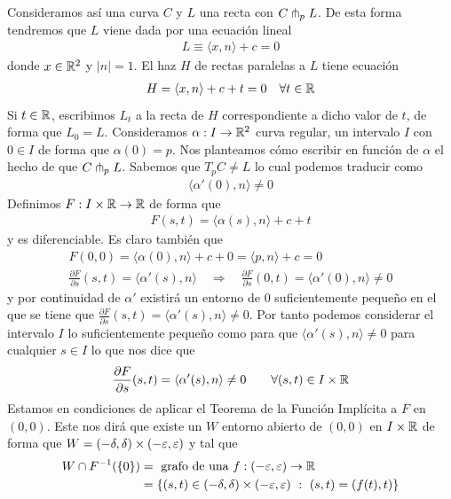 Consideramos así una curva $C$ y $L$ una recta con $C\pitchfork_p L$. De esta forma tendremos que $L$ viene dada por una ecuación lineal 
\begin{gather*}
    L \equiv \langle x,n \rangle + c = 0
\end{gather*}
donde $x\in \mathbb{R}^2$ y $|n|=1$. El haz $H$ de rectas paralelas a $L$ tiene ecuación 
\begin{gather*}
    H = \langle x, n \rangle + c + t = 0 \quad \forall t \in \mathbb{R}
\end{gather*}
Si $t \in \mathbb{R}$, escribimos $L_t$ a la recta de $H$ correspondiente a dicho valor de $t$, de forma que $L_0=L$. Consideramos $\alpha:I \to \mathbb{R}^2$ curva regular, un intervalo $I$ con $0\in I$ de forma que $\alpha(0)=p$. Nos planteamos cómo escribir en función de $\alpha$ el hecho de que $C\pitchfork_pL$. Sabemos que $T_pC \neq L$ lo cual podemos traducir como 
\begin{gather*}
    \langle \alpha'(0),n \rangle \neq 0
\end{gather*}
Definimos $F: I \times \mathbb{R} \to \mathbb{R}$ de forma que 
\begin{gather*}
    F(s,t) = \langle \alpha(s), n \rangle + c + t
\end{gather*}
y es diferenciable. Es claro también que
\begin{gather*}
    F(0,0) = \langle \alpha(0), n \rangle + c + 0 = \langle p,n \rangle + c = 0\\[0.8em]
    \frac{\partial F}{\partial s} (s,t) = \langle \alpha'(s), n \rangle \quad \Rightarrow \quad
    \frac{\partial F}{\partial s}(0,t) = \langle \alpha'(0), n \rangle \neq 0
\end{gather*}
y por continuidad de $\alpha'$ existirá un entorno de $0$ suficientemente pequeño en el que se tiene que $\frac{\partial F}{\partial s}(s,t) = \langle \alpha'(s), n \rangle \neq 0$. Por tanto podemos considerar el intervalo $I$ lo suficientemente pequeño como para que $\langle \alpha'(s), n \rangle\neq 0$ para cualquier $s\in I$ lo que nos dice que 
\begin{gather*}
    \frac{\partial F}{\partial s}(s,t) = \langle \alpha'(s), n \rangle \neq 0 \qquad \forall (s,t) \in I\times \mathbb{R}
\end{gather*}
Estamos en condiciones de aplicar el Teorema de la Función Implícita a $F$ en $(0,0)$. Este nos dirá que existe un $W$ entorno abierto de $(0,0)$ en $I \times \mathbb{R}$ de forma que $W=(-\delta , \delta) \times (-\varepsilon, \varepsilon)$ y tal que 
\begin{align*}
    W\cap F^{-1}(\{0\}) &= \text{ grafo de una }f:(-\veps, \veps) \to \bb{R}\\
    &= \{(s,t)\in (-\delta , \delta) \times (-\veps, \veps)\ : \ (s,t) = (f(t), t) \}
\end{align*}
